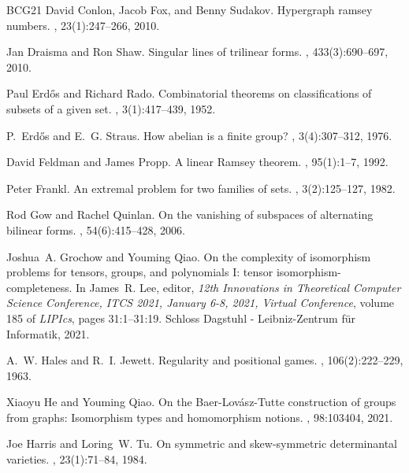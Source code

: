 \begin{thebibliography}{BCG{\etalchar{+}}21}
David Conlon, Jacob Fox, and Benny Sudakov.
\newblock Hypergraph ramsey numbers.
, 23(1):247--266,
  2010.

Jan Draisma and Ron Shaw.
\newblock Singular lines of trilinear forms.
, 433(3):690--697, 2010.

Paul Erd\H{o}s and Richard Rado.
\newblock Combinatorial theorems on classifications of subsets of a given set.
, 3(1):417--439,
  1952.

P.~Erd\H{o}s and E.~G. Straus.
\newblock How abelian is a finite group?
, 3(4):307--312, 1976.

David Feldman and James Propp.
\newblock A linear {Ramsey} theorem.
, 95(1):1--7, 1992.

Peter Frankl.
\newblock An extremal problem for two families of sets.
, 3(2):125--127, 1982.

Rod Gow and Rachel Quinlan.
\newblock On the vanishing of subspaces of alternating bilinear forms.
, 54(6):415--428, 2006.

Joshua~A. Grochow and Youming Qiao.
\newblock On the complexity of isomorphism problems for tensors, groups, and
  polynomials {I:} tensor isomorphism-completeness.
\newblock In James~R. Lee, editor, {\em 12th Innovations in Theoretical
  Computer Science Conference, {ITCS} 2021, January 6-8, 2021, Virtual
  Conference}, volume 185 of {\em LIPIcs}, pages 31:1--31:19. Schloss Dagstuhl
  - Leibniz-Zentrum f{\"{u}}r Informatik, 2021.

A.~W. Hales and R.~I. Jewett.
\newblock Regularity and positional games.
,
  106(2):222--229, 1963.

Xiaoyu He and Youming Qiao.
\newblock On the Baer-Lov{\'{a}}sz-Tutte construction of groups from graphs:
  Isomorphism types and homomorphism notions.
, 98:103404, 2021.

Joe Harris and Loring~W. Tu.
\newblock On symmetric and skew-symmetric determinantal varieties.
, 23(1):71--84, 1984.


\end{thebibliography}
